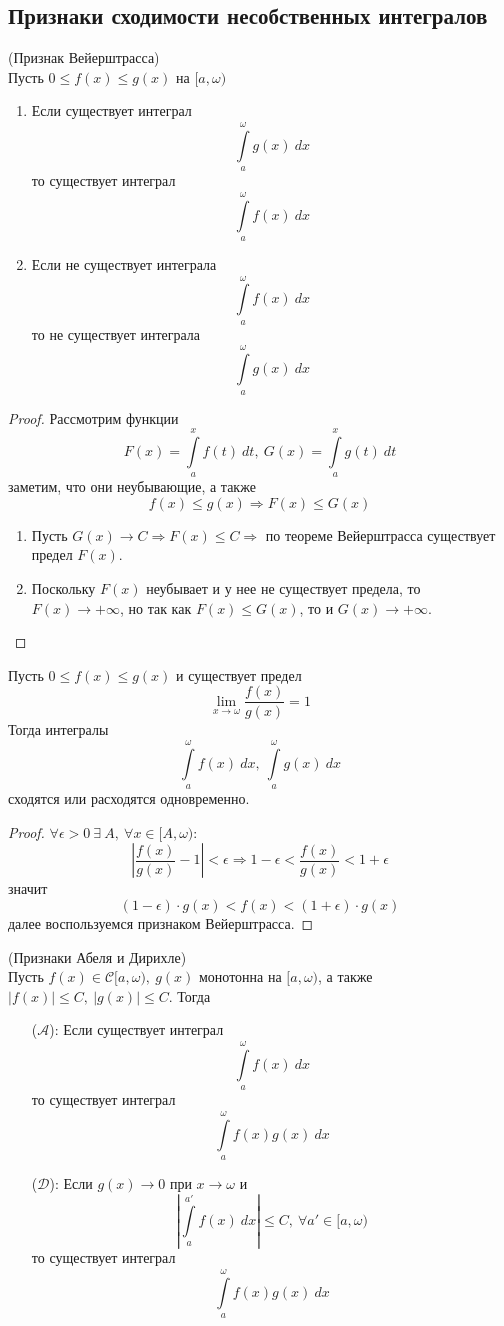 \subsection{Признаки сходимости несобственных интегралов}
\begin{theorem}
    (Признак Вейерштрасса)\\
    Пусть $0\leq f(x)\leq g(x)$ на $[a,\omega)$
    \begin{enumerate} 
    \item Если существует интеграл
    \[\int\limits_{a}^{\omega}g(x)\ dx\]
    то существует интеграл
    \[\int\limits_{a}^{\omega}f(x)\ dx\]
    \item Если не существует интеграла
    \[\int\limits_{a}^{\omega}f(x)\ dx\]
    то не существует интеграла
    \[\int\limits_{a}^{\omega}g(x)\ dx\]
\end{enumerate}
\end{theorem} 
\begin{proof}
    Рассмотрим функции 
    \[F(x)=\int\limits_{a}^{x}f(t)\ dt,\ G(x)=\int\limits_{a}^{x}g(t)\ dt\]
    заметим, что они неубывающие, а также
    \[f(x)\leq g(x) \Rightarrow F(x)\leq G(x)\]
    \begin{enumerate}
        \item Пусть $G(x)\to C \Rightarrow F(x)\leq C \Rightarrow$ по теореме Вейерштрасса существует предел $F(x)$.
        \item Поскольку $F(x)$ неубывает и у нее не существует предела, то $F(x)\to +\infty$, но так как $F(x)\leq G(x)$, то и $G(x)\to +\infty$.
    \end{enumerate}
\end{proof}
\begin{theorem}
    Пусть $0\leq f(x)\leq g(x)$ и существует предел
    \[\lim\limits_{x\to \omega}\frac{f(x)}{g(x)}=1\]
    Тогда интегралы
    \[\int\limits_{a}^{\omega}f(x)\ dx,\ \int\limits_{a}^{\omega}g(x)\ dx\] 
    сходятся или расходятся одновременно.
\end{theorem} 
\begin{proof}
    $\forall \epsilon>0\ \exists\ A,\ \forall x\in [A, \omega)$:
    \[\left|\frac{f(x)}{g(x)}-1\right|<\epsilon \Rightarrow 1-\epsilon<\frac{f(x)}{g(x)}<1+\epsilon\]
    значит
    \[(1-\epsilon)\cdot g(x)<f(x)<(1+\epsilon)\cdot g(x)\]
    далее воспользуемся признаком Вейерштрасса.
\end{proof} 
\begin{theorem}
    (Признаки Абеля и Дирихле)\\
    Пусть $f(x)\in \mathcal{C}[a,\omega),\ g(x)$ монотонна на $[a,\omega)$, а также $|f(x)|\leq C,\ |g(x)|\leq C$. Тогда 
    \begin{itemize}
        \item[($\mathcal{A}$):] Если существует интеграл 
        \[\int\limits_{a}^{\omega}f(x)\ dx\]
        то существует интеграл
        \[\int\limits_{a}^{\omega}f(x)g(x)\ dx\]
        \item[($\mathcal{D}$):] Если $g(x)\to 0$ при $x\to \omega$ и
        \[\left|\int\limits_{a}^{a'}f(x)\ dx\right|\leq C,\ \forall a'\in [a,\omega)\]
        то существует интеграл
        \[\int\limits_{a}^{\omega}f(x)g(x)\ dx\]
    \end{itemize}
\end{theorem} 
